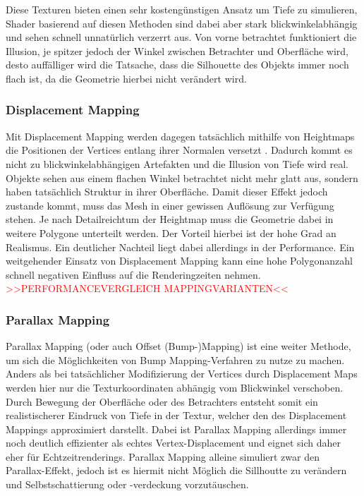 Diese Texturen bieten einen sehr kostengünstigen
Ansatz um Tiefe zu simulieren, Shader basierend auf diesen Methoden sind dabei aber stark 
blickwinkelabhängig und sehen schnell unnatürlich verzerrt aus.
Von vorne betrachtet funktioniert die Illusion, je spitzer jedoch der Winkel zwischen Betrachter und
Oberfläche wird, desto auffälliger wird die Tatsache, dass die Silhouette des Objekts immer 
noch flach ist, da die Geometrie hierbei nicht verändert wird. 

\subsubsection{Displacement Mapping}
Mit Displacement Mapping werden dagegen tatsächlich mithilfe von Heightmaps die Positionen 
der Vertices entlang ihrer Normalen versetzt \parencite{Cook1984,Cook1987}. Dadurch kommt es nicht zu blickwinkelabhängigen Artefakten 
und die Illusion von Tiefe wird real. Objekte sehen aus einem flachen Winkel betrachtet nicht mehr 
glatt aus, sondern haben tatsächlich Struktur in ihrer Oberfläche. Damit dieser Effekt jedoch zustande kommt, 
muss das Mesh in einer gewissen Auflösung zur Verfügung stehen. Je nach Detailreichtum der Heightmap 
muss die Geometrie dabei in weitere Polygone unterteilt werden. Der Vorteil hierbei ist der hohe 
Grad an Realismus. Ein deutlicher Nachteil liegt dabei allerdings in der Performance. 
Ein weitgehender Einsatz von Displacement Mapping kann eine hohe Polygonanzahl schnell 
negativen Einfluss auf die Renderingzeiten nehmen.
\textcolor{red}{>>PERFORMANCEVERGLEICH MAPPINGVARIANTEN<<}

\subsubsection{Parallax Mapping}

Parallax Mapping (oder auch Offset (Bump-)Mapping) ist eine weiter Methode, um sich die Möglichkeiten von
Bump Mapping-Verfahren zu nutze zu machen. Anders als bei tatsächlicher Modifizierung der Vertices 
durch Displacement Maps werden hier nur die Texturkoordinaten abhängig vom Blickwinkel verschoben. \parencite{Kaneko2001}
Durch Bewegung der Oberfläche oder des Betrachters entsteht somit ein realistischerer Eindruck 
von Tiefe in der Textur, welcher den des Displacement Mappings approximiert darstellt. 
Dabei ist Parallax Mapping allerdings immer noch deutlich effizienter als echtes Vertex-Displacement
und eignet sich daher eher für Echtzeitrenderings. Parallax Mapping alleine simuliert zwar den 
Parallax-Effekt, jedoch ist es hiermit nicht Möglich die Sillhoutte zu verändern und 
Selbstschattierung oder -verdeckung vorzutäuschen. 


